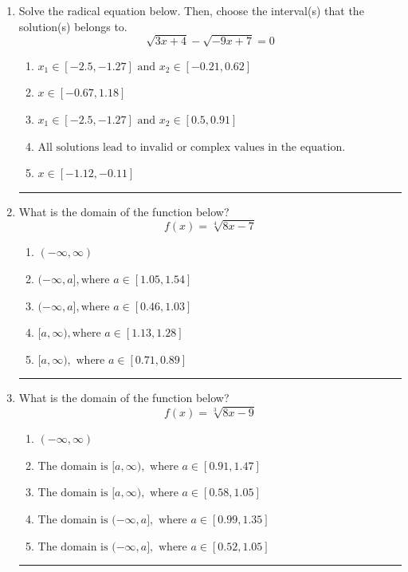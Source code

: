 \documentclass[14pt]{extbook}
\newcommand{\litem}[1]{\item#1\hspace*{-1cm}\rule{\textwidth}{0.4pt}}
\begin{document}
\begin{enumerate}
{\begin{enumerate}[label=\Alph*.]
\end{enumerate} }
\litem{
Solve the radical equation below. Then, choose the interval(s) that the solution(s) belongs to.\[ \sqrt{3 x + 4} - \sqrt{-9 x + 7} = 0 \]\begin{enumerate}[label=\Alph*.]
\item \( x_1 \in [-2.5, -1.27] \text{ and } x_2 \in [-0.21,0.62] \)
\item \( x \in [-0.67,1.18] \)
\item \( x_1 \in [-2.5, -1.27] \text{ and } x_2 \in [0.5,0.91] \)
\item \( \text{All solutions lead to invalid or complex values in the equation.} \)
\item \( x \in [-1.12,-0.11] \)

\end{enumerate} }
\litem{
What is the domain of the function below?\[ f(x) = \sqrt[4]{8 x - 7} \]\begin{enumerate}[label=\Alph*.]
\item \( (-\infty, \infty) \)
\item \( (-\infty, a], \text{where } a \in [1.05, 1.54] \)
\item \( (-\infty, a], \text{where } a \in [0.46, 1.03] \)
\item \( [a, \infty), \text{where } a \in [1.13, 1.28] \)
\item \( [a, \infty), \text{ where } a \in [0.71, 0.89] \)

\end{enumerate} }
\litem{
What is the domain of the function below?\[ f(x) = \sqrt[3]{8 x - 9} \]\begin{enumerate}[label=\Alph*.]
\item \( (-\infty, \infty) \)
\item \( \text{The domain is } [a, \infty), \text{   where } a \in [0.91, 1.47] \)
\item \( \text{The domain is } [a, \infty), \text{   where } a \in [0.58, 1.05] \)
\item \( \text{The domain is } (-\infty, a], \text{   where } a \in [0.99, 1.35] \)
\item \( \text{The domain is } (-\infty, a], \text{   where } a \in [0.52, 1.05] \)


\end{enumerate}}
\end{enumerate}
\end{document}
